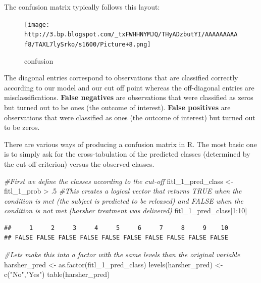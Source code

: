\documentclass[
]{book}
\newenvironment{Shaded}{\begin{snugshade}}{\end{snugshade}}
\newcommand{\CommentTok}[1]{\textcolor[rgb]{0.56,0.35,0.01}{\textit{#1}}}
\newcommand{\DecValTok}[1]{\textcolor[rgb]{0.00,0.00,0.81}{#1}}
\newcommand{\FunctionTok}[1]{\textcolor[rgb]{0.00,0.00,0.00}{#1}}
\newcommand{\NormalTok}[1]{#1}
\newcommand{\OtherTok}[1]{\textcolor[rgb]{0.56,0.35,0.01}{#1}}
\newcommand{\SpecialCharTok}[1]{\textcolor[rgb]{0.00,0.00,0.00}{#1}}
\newcommand{\StringTok}[1]{\textcolor[rgb]{0.31,0.60,0.02}{#1}}
\begin{document}
The confusion matrix typically follows this layout:

\begin{figure}
\centering
\texttt{[image: http://3.bp.blogspot.com/\_txFWHHNYMJQ/THyADzbutYI/AAAAAAAAAf8/TAXL7lySrko/s1600/Picture+8.png]}
\caption{confusion}
\end{figure}

The diagonal entries correspond to observations that are classified correctly according to our model and our cut off point whereas the off-diagonal entries are misclassifications. \textbf{False negatives} are observations that were classified as zeros but turned out to be ones (the outcome of interest). \textbf{False positives} are observations that were classified as ones (the outcome of interest) but turned out to be zeros.

There are various ways of producing a confusion matrix in R. The most basic one is to simply ask for the cross-tabulation of the predicted classes (determined by the cut-off criterion) versus the observed classes.

\begin{Shaded}
\begin{Highlighting}[]
\CommentTok{\#First we define the classes according to the cut{-}off}
\NormalTok{fitl\_1\_pred\_class }\OtherTok{\textless{}{-}}\NormalTok{ fitl\_1\_prob }\SpecialCharTok{\textgreater{}}\NormalTok{ .}\DecValTok{5}
\CommentTok{\#This creates a logical vector that returns TRUE when the condition is met (the subject is predicted to be released) and FALSE when the condition is not met (harsher treatment was delivered)}
\NormalTok{fitl\_1\_pred\_class[}\DecValTok{1}\SpecialCharTok{:}\DecValTok{10}\NormalTok{]}
\end{Highlighting}
\end{Shaded}

\begin{verbatim}
##     1     2     3     4     5     6     7     8     9    10 
## FALSE FALSE FALSE FALSE FALSE FALSE FALSE FALSE FALSE FALSE
\end{verbatim}

\begin{Shaded}
\begin{Highlighting}[]
\CommentTok{\#Let\textquotesingle{}s make this into a factor with the same levels than the original variable}
\NormalTok{harsher\_pred }\OtherTok{\textless{}{-}} \FunctionTok{as.factor}\NormalTok{(fitl\_1\_pred\_class)}
\FunctionTok{levels}\NormalTok{(harsher\_pred) }\OtherTok{\textless{}{-}} \FunctionTok{c}\NormalTok{(}\StringTok{"No"}\NormalTok{,}\StringTok{"Yes"}\NormalTok{)}
\FunctionTok{table}\NormalTok{(harsher\_pred)}
\end{Highlighting}
\end{Shaded}
\end{document}
